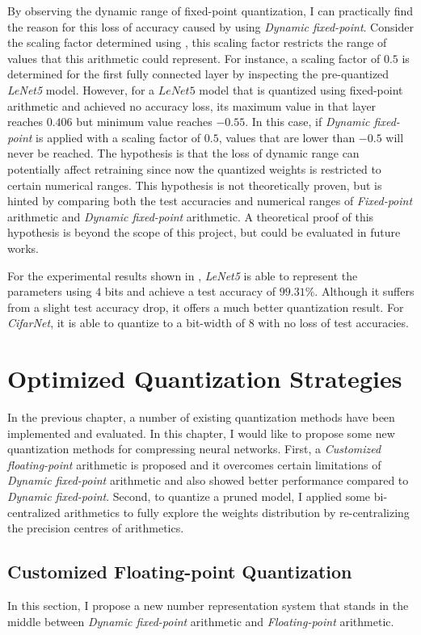 \documentclass[a4paper,12pt]{report}
\begin{document}
By observing the dynamic range of fixed-point quantization, I can practically
find the reason for this loss of accuracy caused by using \textit{Dynamic fixed-point}.
Consider the scaling factor determined using , this
scaling factor restricts the range of values that this arithmetic could represent.
For instance, a scaling factor of $0.5$ is determined for the first fully
connected layer by inspecting the pre-quantized \textit{LeNet5} model.
However, for a $LeNet5$ model that is quantized using fixed-point arithmetic and
achieved no accuracy loss, its maximum value in that layer reaches $0.406$ but
minimum value reaches $-0.55$.
In this case, if \textit{Dynamic fixed-point} is applied with a scaling factor of $0.5$, values that are lower
than $-0.5$ will never be reached.
The hypothesis is that the loss of dynamic range can potentially affect retraining
since now the quantized weights is restricted to certain numerical ranges.
This hypothesis is not theoretically proven, but is hinted by comparing both
the test accuracies and numerical ranges of \textit{Fixed-point} arithmetic
and \textit{Dynamic fixed-point} arithmetic.
A theoretical proof of this hypothesis is beyond the scope of this project, but
could be evaluated in future works.

For the experimental results shown in , \textit{LeNet5} is
able to represent the parameters using $4$ bits and achieve a test accuracy of
$99.31\%$.
Although it suffers from a slight test accuracy drop, it offers a much better
quantization result.
For \textit{CifarNet}, it is able to quantize to a bit-width of $8$ with no loss
of test accuracies.

\chapter{Optimized Quantization Strategies}
In the previous chapter, a number of existing quantization methods have been
implemented and evaluated.
In this chapter, I would like to propose some new quantization methods for
compressing neural networks.
First, a \textit{Customized floating-point} arithmetic is proposed and it overcomes
certain limitations of \textit{Dynamic fixed-point} arithmetic and also showed
better performance compared to \textit{Dynamic fixed-point}.
Second, to quantize a pruned model, I applied some bi-centralized arithmetics
to fully explore the weights distribution by re-centralizing the precision
centres of arithmetics.

\section{Customized Floating-point Quantization}
In this section, I propose a new number representation system that stands in
the middle between \textit{Dynamic fixed-point} arithmetic and
\textit{Floating-point} arithmetic.
\end{document}
